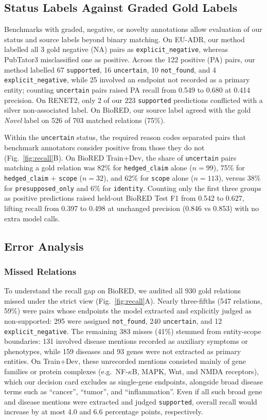 \documentclass[preprint,10pt,letterpaper]{elsarticle}
\newcommand{\st}[1]{\texttt{#1}}             %
\begin{document}
\subsection{Status Labels Against Graded Gold Labels}
Benchmarks with graded, negative, or novelty annotations allow evaluation of our status and source labels beyond binary matching. On EU-ADR, our method labelled all 3 gold negative (NA) pairs as \st{explicit\_negative}, whereas PubTator3 misclassified one as positive. Across the 122 positive (PA) pairs, our method labelled 67 \st{supported}, 16 \st{uncertain}, 10 \st{not\_found}, and 4 \st{explicit\_negative}, while 25 involved an endpoint not recorded as a primary entity; counting \st{uncertain} pairs raised PA recall from 0.549 to 0.680 at 0.414 precision. On RENET2, only 2 of our 223 \st{supported} predictions conflicted with a silver non-associated label. On BioRED, our source label agreed with the gold \emph{Novel} label on 526 of 703 matched relations (75\%).

Within the \st{uncertain} status, the required reason codes separated pairs that benchmark annotators consider positive from those they do not (Fig.~\ref{fig:recall}B). On BioRED Train+Dev, the share of \st{uncertain} pairs matching a gold relation was 82\% for \st{hedged\_claim} alone ($n=99$), 75\% for \st{hedged\_claim} + \st{scope} ($n=32$), and 62\% for \st{scope} alone ($n=113$), versus 38\% for \st{presupposed\_only} and 6\% for \st{identity}. Counting only the first three groups as positive predictions raised held-out BioRED Test F1 from 0.542 to 0.627, lifting recall from 0.397 to 0.498 at unchanged precision (0.846 vs 0.853) with no extra model calls.

\subsection{Error Analysis}

\subsubsection{Missed Relations}
To understand the recall gap on BioRED, we audited all 930 gold relations missed under the strict view (Fig.~\ref{fig:recall}A). Nearly three-fifths (547 relations, 59\%) were pairs whose endpoints the model extracted and explicitly judged as non-supported: 295 were assigned \st{not\_found}, 240 \st{uncertain}, and 12 \st{explicit\_negative}. The remaining 383 misses (41\%) stemmed from entity-scope boundaries: 131 involved disease mentions recorded as auxiliary symptoms or phenotypes, while 159 diseases and 93 genes were not extracted as primary entities. On Train+Dev, these unrecorded mentions consisted mainly of gene families or protein complexes (e.g.\ NF-$\kappa$B, MAPK, Wnt, and NMDA receptors), which our decision card excludes as single-gene endpoints, alongside broad disease terms such as ``cancer'', ``tumor'', and ``inflammation''. Even if all such broad gene and disease mentions were extracted and judged \st{supported}, overall recall would increase by at most 4.0 and 6.6 percentage points, respectively.
\end{document}
